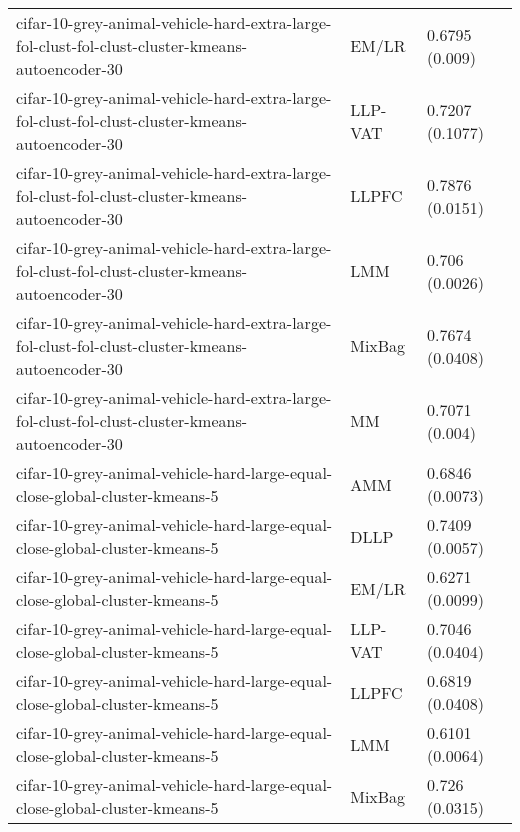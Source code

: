 \begin{longtable}{lll}
              cifar-10-grey-animal-vehicle-hard-extra-large-fol-clust-fol-clust-cluster-kmeans-autoencoder-30 &     EM/LR &                        0.6795 (0.009) \\
              cifar-10-grey-animal-vehicle-hard-extra-large-fol-clust-fol-clust-cluster-kmeans-autoencoder-30 &   LLP-VAT &                       0.7207 (0.1077) \\
              cifar-10-grey-animal-vehicle-hard-extra-large-fol-clust-fol-clust-cluster-kmeans-autoencoder-30 &     LLPFC &                       0.7876 (0.0151) \\
              cifar-10-grey-animal-vehicle-hard-extra-large-fol-clust-fol-clust-cluster-kmeans-autoencoder-30 &       LMM &                        0.706 (0.0026) \\
              cifar-10-grey-animal-vehicle-hard-extra-large-fol-clust-fol-clust-cluster-kmeans-autoencoder-30 &    MixBag &                       0.7674 (0.0408) \\
              cifar-10-grey-animal-vehicle-hard-extra-large-fol-clust-fol-clust-cluster-kmeans-autoencoder-30 &        MM &                        0.7071 (0.004) \\
                                  cifar-10-grey-animal-vehicle-hard-large-equal-close-global-cluster-kmeans-5 &       AMM &                       0.6846 (0.0073) \\
                                  cifar-10-grey-animal-vehicle-hard-large-equal-close-global-cluster-kmeans-5 &      DLLP &                       0.7409 (0.0057) \\
                                  cifar-10-grey-animal-vehicle-hard-large-equal-close-global-cluster-kmeans-5 &     EM/LR &                       0.6271 (0.0099) \\
                                  cifar-10-grey-animal-vehicle-hard-large-equal-close-global-cluster-kmeans-5 &   LLP-VAT &                       0.7046 (0.0404) \\
                                  cifar-10-grey-animal-vehicle-hard-large-equal-close-global-cluster-kmeans-5 &     LLPFC &                       0.6819 (0.0408) \\
                                  cifar-10-grey-animal-vehicle-hard-large-equal-close-global-cluster-kmeans-5 &       LMM &                       0.6101 (0.0064) \\
                                  cifar-10-grey-animal-vehicle-hard-large-equal-close-global-cluster-kmeans-5 &    MixBag &                        0.726 (0.0315) \\

\end{longtable}
